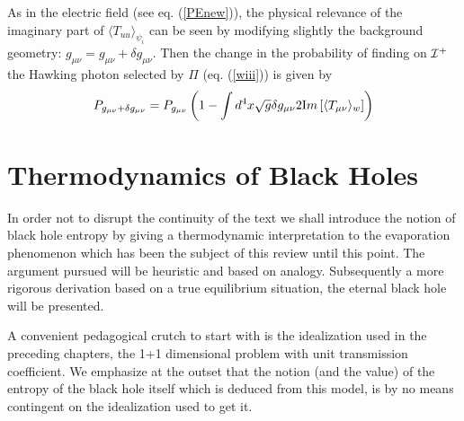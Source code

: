 \documentclass[12pt,oneside]{report}
\begin{document}
As in the electric field (see eq. (\ref{PEnew})), 
the physical relevance of the imaginary part
of $\langle T_{uu} \rangle_{\psi_i}$ can be seen by modifying slightly
the background geometry: $g_{\mu \nu} = g_{\mu \nu} + \delta g_{\mu \nu}$.
Then the change in the probability of finding on ${\cal I}^+$ the Hawking
photon selected by $\Pi$ (eq. (\ref{wiii})) is given by
\begin{eqnarray}
P_{g_{\mu \nu} + \delta g_{\mu \nu}} = P_{g_{\mu \nu}} \left(1 - \int d^4 x 
\sqrt{g} \delta g_{\mu \nu} 2 {\mbox Im} \left[\langle 
T_{\mu \nu}\rangle_w \right] \right)\label{physrela} 
\end{eqnarray} 




\section {Thermodynamics of Black Holes}\label{thermm}

In order not to disrupt the continuity of the text we shall 
introduce the notion of black hole entropy by giving a thermodynamic
interpretation to the evaporation phenomenon which has been the subject
of this review until this point. The argument pursued will be heuristic
and based on analogy. Subsequently a more rigorous derivation based on a
true equilibrium situation, the eternal black hole will be presented.

A convenient pedagogical crutch to start with is the idealization 
used in the preceding chapters,
the 1+1 dimensional problem with unit transmission coefficient. We
emphasize at the outset that the notion (and the value) of the entropy of
the black hole itself which is deduced from this model, is by no means
contingent on the idealization used to get it.
\end{document}
